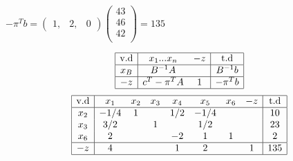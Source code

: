 \documentclass{article}
\begin{document}
\begin{center}
   $-\pi^Tb=
   \begin{pmatrix}
      1,&2,&0
   \end{pmatrix}
   \begin{pmatrix}
     43\\
     46\\
     42\\
   \end{pmatrix}
   =135$
\begin{spacing}{2}
   \begin{equation*}
      \begin{array}{|c|cc|c|}
         \hline
         \text{v.d} & x_1...x_n& -z & \text{t.d} \\ \hline

         x_B        & B^{-1}A&    & B^{-1}b \\ \hline 
         -z         &c^T-\pi^TA&  1 & -\pi^Tb\\ \hline
      \end{array}
   \end{equation*}
   \begin{equation*}
      \begin{array}{|c|ccccccc|c|}
         \hline
         \text{v.d} & x_1 & x_2 & x_3 & x_4 & x_5 & x_6 & -z & \text{t.d} \\ \hline
       x_2&  -1/4  &  1  &     &  1/2  &  -1/4  &   &   & 10 \\
       x_3&  3/2   &     &  1  &      &   1/2  &   &   & 23\\  
       x_6&  2     &     &     &  -2   &  1     & 1 &   & 2 \\ \hline 
       -z & 4    &   &    &  1   &  2     &  & 1 & 135 \\ \hline
      \end{array}
      \end{equation*}
\end{spacing}
\end{center}
\end{document}
